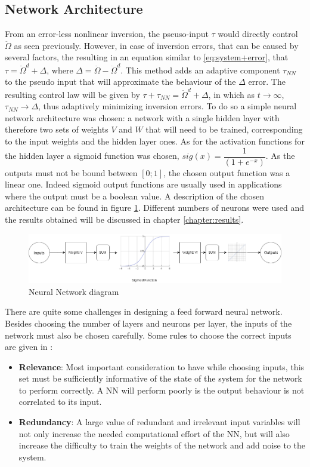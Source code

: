 \subsection{Network Architecture}
From an error-less nonlinear inversion, the pseuso-input $\tau$ would directly control $\ddot{\Omega}$ as seen previously. However, in case of inversion errors, that can be caused by several factors, the resulting in an equation similar to \ref{eq:system+error}, that $\tau = \ddot{\Omega}^d + \Delta$, where $\Delta = \ddot{\Omega}- \ddot{\Omega} ^d$. This method adds an adaptive component $\tau_{NN}$ to the pseudo input that will approximate the behaviour of the $\Delta$ error. The resulting control law will be given by $\tau + \tau_{NN} = \ddot{\Omega}^d + \Delta$, in which as $t \rightarrow \infty$, $\tau_{NN} \rightarrow \Delta$, thus adaptively minimizing inversion errors. To do so a simple neural network architecture was chosen: a network with a single hidden layer with therefore two sets of weights $V$ and $W$ that will need to be trained, corresponding to the input weights and the hidden layer ones. As for the activation functions for the hidden layer a sigmoid function was chosen, $sig(x)=\dfrac{1}{(1+e^{-x})}$. As the outputs must not be bound between $[0;1]$, the chosen output function was a linear one. Indeed sigmoid output functions are usually used in applications where the output must be a boolean value. A description of the chosen architecture can be found in figure \ref{fig:NN}. Different numbers of neurons were used and the results obtained will be discussed in chapter \ref{chapter:results}.

\begin{figure}[!htb]
  \centering
  \includegraphics[width=1\textwidth]{Figures/NN.png}
  \caption[Neural Network diagram]{Neural Network diagram}
  \label{fig:NN}
\end{figure}

There are quite some challenges in designing a feed forward neural network. Besides choosing the number of layers and neurons per layer, the inputs of the network must also be chosen carefully. Some rules to choose the correct inputs are given in \cite{NN_inputs}:
\begin{itemize}
\item \textbf{Relevance}: Most important consideration to have while choosing inputs, this set must be sufficiently informative of the state of the system for the network to perform correctly. A NN will perform poorly is the output behaviour is not correlated to its input.
\item \textbf{Redundancy}: A large value of redundant and irrelevant input variables will not only increase the needed computational effort of the NN, but will also increase the difficulty to train the weights of the network and add noise to the system.
\end{itemize}

